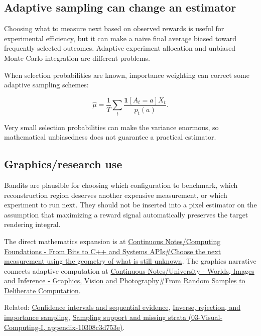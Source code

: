 \subsection{Adaptive sampling can change an estimator}\label{adaptive-sampling-can-change-an-estimator}

Choosing what to measure next based on observed rewards is useful for experimental efficiency, but it can make a naive final average biased toward frequently selected outcomes. Adaptive experiment allocation and unbiased Monte Carlo integration are different problems.

When selection probabilities are known, importance weighting can correct some adaptive sampling schemes:

\[
\hat\mu=
\frac1T\sum_t
\frac{\mathbf 1[A_t=a]X_t}{p_t(a)}.
\]

Very small selection probabilities can make the variance enormous, so mathematical unbiasedness does not guarantee a practical estimator.

\subsection{Graphics/research use}\label{graphicsresearch-use}

Bandits are plausible for choosing which configuration to benchmark, which reconstruction region deserves another expensive measurement, or which experiment to run next. They should not be inserted into a pixel estimator on the assumption that maximizing a reward signal automatically preserves the target rendering integral.

The direct mathematics expansion is at \href{Continuous\%20Notes/Computing\%20Foundations\%20-\%20From\%20Bits\%20to\%20C++\%20and\%20Systems\%20APIs\#Choose\%20the\%20next\%20measurement\%20using\%20the\%20geometry\%20of\%20what\%20is\%20still\%20unknown}{Continuous Notes/Computing Foundations - From Bits to C++ and Systems APIs\#Choose the next measurement using the geometry of what is still unknown}. The graphics narrative connects adaptive computation at \href{Continuous\%20Notes/University\%20-\%20Worlds,\%20Images\%20and\%20Inference\%20-\%20Graphics,\%20Vision\%20and\%20Photography\#From\%20Random\%20Samples\%20to\%20Deliberate\%20Computation}{Continuous Notes/University - Worlds, Images and Inference - Graphics, Vision and Photography\#From Random Samples to Deliberate Computation}.

Related: \hyperref[appendix-c83016554b1e]{Confidence intervals and sequential evidence}, \hyperref[appendix-8d863ed954d0]{Inverse, rejection, and importance sampling}, \href{}{Sampling support and missing strata (03-Visual-Computing-I, appendix-10308c3d753e)}.
